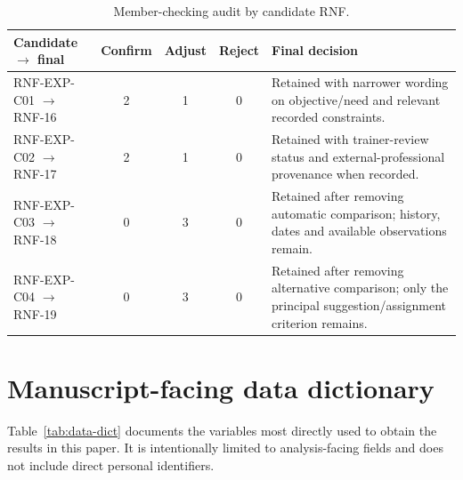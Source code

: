 \documentclass[pdflatex,sn-basic]{sn-jnl}
\begin{document}
\begin{table}[H]
\caption{Member-checking audit by candidate RNF.}\label{tab:mc-audit}
\centering\footnotesize
\begin{tabularx}{\textwidth}{@{}p{2.3cm}cccX@{}}
\toprule
Candidate $\rightarrow$ final & Confirm & Adjust & Reject & Final decision \\
\midrule
RNF-EXP-C01 $\rightarrow$ RNF-16 & 2 & 1 & 0 & Retained with narrower wording on objective/need and relevant recorded constraints.\\
RNF-EXP-C02 $\rightarrow$ RNF-17 & 2 & 1 & 0 & Retained with trainer-review status and external-professional provenance when recorded.\\
RNF-EXP-C03 $\rightarrow$ RNF-18 & 0 & 3 & 0 & Retained after removing automatic comparison; history, dates and available observations remain.\\
RNF-EXP-C04 $\rightarrow$ RNF-19 & 0 & 3 & 0 & Retained after removing alternative comparison; only the principal suggestion/assignment criterion remains.\\
\bottomrule
\end{tabularx}
\end{table}


\section{Manuscript-facing data dictionary}\label{app:data-dict}
Table~\ref{tab:data-dict} documents the variables most directly used to obtain the results in this paper. It is intentionally limited to analysis-facing fields and does not include direct personal identifiers.
\end{document}
